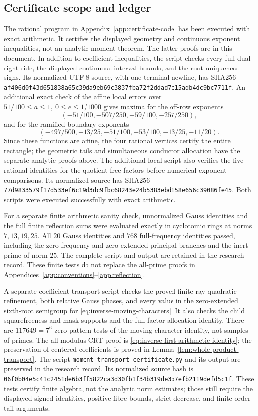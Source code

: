 \documentclass[12pt]{article}
\begin{document}
\subsection{Certificate scope and ledger}
The rational program in Appendix~\ref{app:certificate-code} has
been executed with exact arithmetic.  It certifies the displayed
geometry and continuous exponent inequalities, not an analytic
moment theorem.  The latter proofs are in this document.
In addition to coefficient inequalities, the script checks every
full dual right side, the displayed continuous interval bounds, and
the root-uniqueness signs.  Its normalized UTF-8 source, with one
terminal newline, has SHA256
\nolinkurl{af406d0f43d651838a65c39da9eb69c3837fba72f2ddad7c15adb4dc9bc7711f}.
An additional exact check of the affine local errors over
\(51/100\le a\le1,\ 0\le e\le1/1000\) gives maxima
for the off-row exponents
\[
 (-51/100,-507/250,-59/100,-257/250),
\]
and for the ramified boundary exponents
\[
 (-497/500,-13/25,-51/100,-53/100,-13/25,-11/20).
\]
Since these functions are affine, the four rational vertices
certify the entire rectangle; the geometric tails and simultaneous
conductor allocation have the separate analytic proofs above.
The additional local script also verifies the five rational identities
for the quotient-free factors before numerical exponent comparisons.
Its normalized source has SHA256
\nolinkurl{77d9833579f17d533ef6c19d3dc9fbc68243e24b5383ebd158e656c39086fe45}.
Both scripts were executed successfully with exact arithmetic.

For a separate finite arithmetic sanity check, unnormalized Gauss
identities and the full finite reflection sums were evaluated exactly
in cyclotomic rings at norms \(7,13,19,25\).
All \(20\) Gauss identities and \(768\) full-frequency identities
passed, including the zero-frequency and zero-extended principal
branches and the inert prime of norm \(25\).  The complete script
and output are retained in the research record.  These finite tests
do not replace the all-prime proofs in
Appendices~\ref{app:conventions}--\ref{app:reflection}.

A separate coefficient-transport script checks the proved finite-ray
quadratic refinement, both relative Gauss phases, and every value in the
zero-extended sixth-root semigroup for
\eqref{eq:inverse-moving-characters}.  It also checks the child
squarefreeness and mask supports and the full factor-allocation identity.
There are \(117649=7^6\) zero-pattern tests of the moving-character
identity, not samples of primes.  The all-modulus CRT proof is
\eqref{eq:inverse-first-arithmetic-identity}; the preservation of
centered coefficients is proved in
Lemma~\ref{lem:whole-product-transport}.
The script \texttt{moment\_transport\_certificate.py} and its output
are preserved in the research record.  Its normalized source hash is
\nolinkurl{06f0b04e5c41c2451de6b3ff5822ca3d30fb1f34b319de3b7efb2119defd5c1f}.
These tests certify finite algebra, not the analytic norm estimates;
those still require the displayed signed identities, positive
fibre bounds, strict decrease, and finite-order tail arguments.
\end{document}
